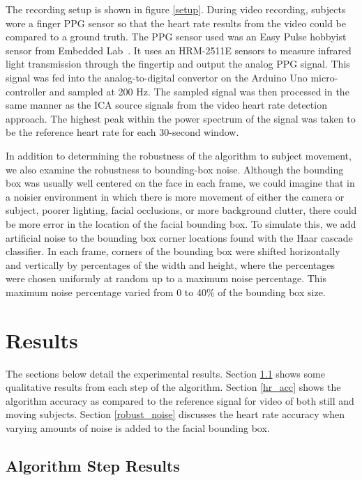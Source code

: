 \documentclass[10pt,twocolumn,letterpaper]{article}
\begin{document}
The recording setup is shown in figure \ref{setup}. During video recording, subjects wore a finger PPG sensor so that the heart rate results from the video could be compared to a ground truth. The PPG sensor used was an Easy Pulse hobbyist sensor from Embedded Lab~\cite{Bhatt:aa}. It uses an HRM-2511E sensors to measure infrared light transmission through the fingertip and output the analog PPG signal. This signal was fed into the analog-to-digital convertor on the Arduino Uno micro-controller and sampled at 200 Hz. The sampled signal was then processed in the same manner as the ICA source signals from the video heart rate detection approach. The highest peak within the power spectrum of the signal was taken to be the reference heart rate for each 30-second window.

In addition to determining the robustness of the algorithm to subject movement, we also examine the robustness to bounding-box noise. Although the bounding box was usually well centered on the face in each frame, we could imagine that in a noisier environment in which there is more movement of either the camera or subject, poorer lighting, facial occlusions, or more background clutter, there could be more error in the location of the facial bounding box. To simulate this, we add artificial noise to the bounding box corner locations found with the Haar cascade classifier. In each frame, corners of the bounding box were shifted horizontally and vertically by percentages of the width and height, where the percentages were chosen uniformly at random up to a maximum noise percentage. This maximum noise percentage varied from 0 to 40\% of the bounding box size.

\section{Results}

The sections below detail the experimental results. Section \ref{step_results} shows some qualitative results from each step of the algorithm. Section \ref{hr_acc} shows the algorithm accuracy as compared to the reference signal for video of both still and moving subjects. Section \ref{robust_noise} discusses the heart rate accuracy when varying amounts of noise is added to the facial bounding box.

\subsection{Algorithm Step Results} \label{step_results}
\end{document}
